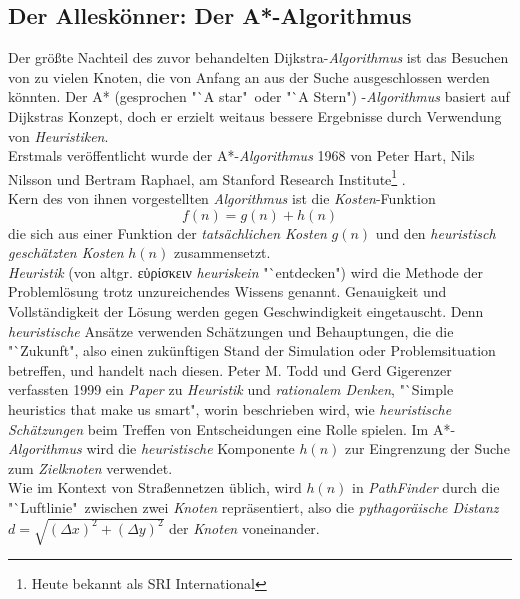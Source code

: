 \documentclass[12pt]{article}
\begin{document}
\subsection{Der Alleskönner: Der A*-Algorithmus}
Der größte Nachteil des zuvor behandelten Dijkstra-\textit{Algorithmus} ist das Besuchen von zu vielen Knoten, die von Anfang an aus der Suche ausgeschlossen werden könnten. Der A* (gesprochen "`A star"\ oder "`A Stern") -\textit{Algorithmus} basiert auf Dijkstras Konzept, doch er erzielt weitaus bessere Ergebnisse durch Verwendung von \textit{Heuristiken}.
\\
Erstmals veröffentlicht wurde der A*-\textit{Algorithmus} 1968 von Peter Hart, Nils Nilsson und Bertram Raphael, am Stanford Research Institute\footnote{Heute bekannt als SRI International} \cite{astar}.
\\
Kern des von ihnen vorgestellten \textit{Algorithmus} ist die \textit{Kosten}-Funktion
\[
f(n) = g(n) + h(n)
\]
die sich aus einer Funktion der \textit{tatsächlichen Kosten} $g(n)$ und den \textit{heuristisch geschätzten Kosten} $h(n)$ zusammensetzt.
\\
\textit{Heuristik} (von altgr. \textgreek{εὑρίσκειν} \textit{heuriskein} "`entdecken") wird die Methode der Problemlösung trotz unzureichendes Wissens genannt. Genauigkeit und Vollständigkeit der Lösung werden gegen Geschwindigkeit eingetauscht. Denn \textit{heuristische} Ansätze verwenden Schätzungen und Behauptungen, die die "`Zukunft", also einen zukünftigen Stand der Simulation oder Problemsituation betreffen, und handelt nach diesen. Peter M. Todd und Gerd Gigerenzer verfassten 1999 ein \textit{Paper} zu \textit{Heuristik} und \textit{rationalem Denken}, "`Simple heuristics that make us smart"\cite{heuristics}, worin beschrieben wird, wie \textit{heuristische Schätzungen} beim Treffen von Entscheidungen eine Rolle spielen. Im A*-\textit{Algorithmus} wird die \textit{heuristische} Komponente $h(n)$ zur Eingrenzung der Suche zum \textit{Zielknoten} verwendet. 
\\
Wie im Kontext von Straßennetzen üblich, wird $h(n)$ in \textit{PathFinder} durch die "`Luftlinie"\ zwischen zwei \textit{Knoten} repräsentiert, also die \textit{pythagoräische Distanz} $d = \sqrt{(\Delta x)^2 + (\Delta y)^2}$ der \textit{Knoten} voneinander.
\label{sec:astar}
\end{document}
